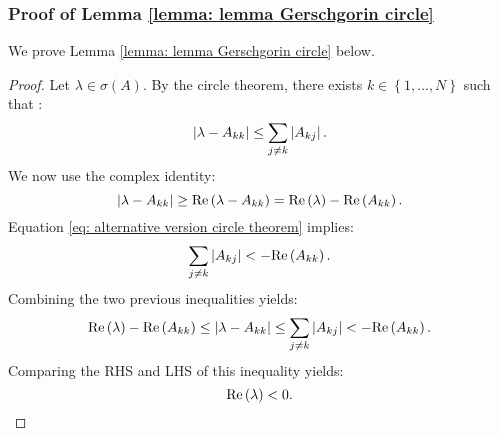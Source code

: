\documentclass[12pt, titlepage, twoside, openright]{report}
\begin{document}
\subsubsection{Proof of Lemma \ref{lemma: lemma Gerschgorin circle}}\label{sec : proof of lemma circle}
We prove Lemma \ref{lemma: lemma Gerschgorin circle} below.
\begin{proof}
Let $\lambda \in \sigma(A)$. By the circle theorem, there exists $k \in \left\{1,\dots, N\right\}$ such that :
\begin{equation}
\left|{\lambda-A_{kk}}\right| \leq \sum_{j\neq k} \left|{A_{kj}}\right|.
\end{equation}
We now use the complex identity:
\begin{equation}
\left|{\lambda-A_{kk}}\right| \geq \text{Re}\left(\lambda-A_{kk}\right) = \text{Re}\left(\lambda\right)-\text{Re}\left(A_{kk}\right).
\end{equation}
Equation \eqref{eq: alternative version circle theorem} implies:
\begin{equation}
\sum_{j\neq k}\left|{A_{kj}}\right| < - \text{Re}\left(A_{kk}\right).
\end{equation}
Combining the two previous inequalities yields:
\begin{equation}
\text{Re}\left(\lambda\right)-\text{Re}\left(A_{kk}\right) \leq \left|{\lambda-A_{kk}}\right| \leq \sum_{j\neq k} \left|{A_{kj}}\right| < -\text{Re}\left(A_{kk}\right).
\end{equation}
Comparing the RHS and LHS of this inequality yields:
\begin{equation}
\text{Re}\left(\lambda\right) < 0.
\end{equation}
\end{proof}
\end{document}

